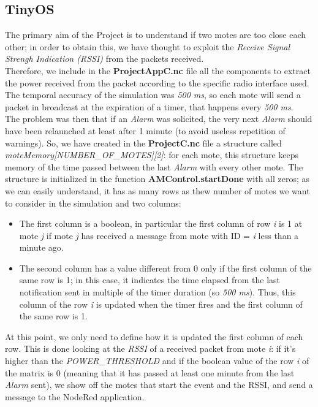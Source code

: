 
\subsection{TinyOS}
The primary aim of the Project is to understand if two motes are too close each other; 
in order to obtain this, we have thought to exploit the \textit{Receive Signal Strengh Indication (RSSI)}
from the packets received. \\
Therefore, we include in the \textbf{ProjectAppC.nc} file all the components to extract the power received 
from the packet according to the specific radio interface used. \\
The temporal accuracy of the simulation was \textit{500 ms}, so each mote will send a packet in broadcast 
at the expiration of a timer, that happens every \textit{500 ms}.\\
The problem was then that if an \textit{Alarm} was solicited, the very next \textit{Alarm} should have been
relaunched at least after 1 minute (to avoid useless repetition of warnings).
So, we have created in the \textbf{ProjectC.nc} file a structure called \textit{moteMemory[NUMBER\_OF\_MOTES][2]}: for each mote, 
this structure keeps memory of the time passed between the last \textit{Alarm} with every other mote. 
The structure is initialized in the function \textbf{AMControl.startDone} with all zeros; as we can easily understand, it has as
many rows as thew number of motes we want to consider in the simulation and two columns:
\begin{itemize}
    \item The first column is a boolean, in particular the first column of row \textit{i} is 1 at mote \textit{j} if mote 
            \textit{j} has received a message from mote with ID = \textit{i} less than a minute ago.
    \item The second column has a value different from 0 only if the first column of the same row is 1; in this case, it indicates
            the time elapsed from the last notification sent in multiple of the timer duration (so \textit{500 ms}). Thus, this
            column of the row \textit{i} is updated when the timer fires and the first column of the same row is 1.
\end{itemize}
At this point, we only need to define how it is updated the first column of each row. This is done looking at the \textit{RSSI} of 
a received packet from mote \textit{i}: if it's higher than the \textit{POWER\_THRESHOLD} and if the boolean value of the row
\textit{i} of the matrix is 0 (meaning that it has passed at least one minute from the last \textit{Alarm} sent), we show off the
motes that start the event and the RSSI, and send a message to the NodeRed application.


